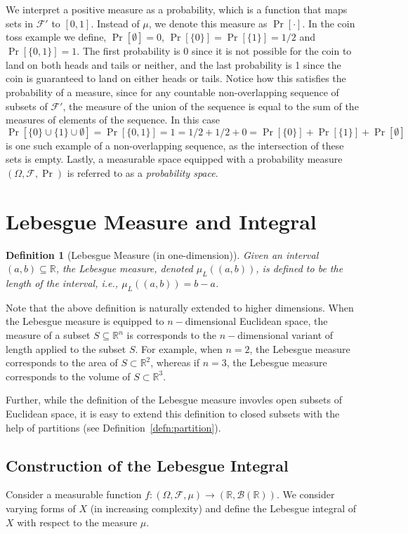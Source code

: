 \documentclass[10pt, oneside]{article}
\newcommand{\R}{\mathbb{R}}
\newtheorem{defn}{Definition}
\begin{document}
We interpret a positive measure as a probability, which is a function that maps sets in $\mathcal{F}'$ to $[0,1]$.
Instead of $\mu$, we denote this measure as $\Pr[\cdot]$.
In the coin toss example we define, $\Pr[\emptyset]=0$, $\Pr[\{0\}]=\Pr[\{1\}]=1/2$ and $\Pr[\{0,1\}]=1$.
The first probability is 0 since it is not possible for the coin to land on both heads and tails or neither, and the last probability is 1 since the coin is guaranteed to land on either heads or tails.
Notice how this satisfies the probability of a measure, since for any countable non-overlapping sequence of subsets of $\mathcal{F}'$, the measure of the union of the sequence is equal to the sum of the measures of elements of the sequence. In this case
$$\Pr[\{0\}\cup\{1\}\cup\emptyset]=\Pr[\{0,1\}]=1=1/2+1/2+0=\Pr[\{0\}]+\Pr[\{1\}]+\Pr[\emptyset]$$
is one such example of a non-overlapping sequence, as the intersection of these sets is empty.
Lastly, a measurable space equipped with a probability measure $(\Omega,\mathcal{F},\Pr)$ is referred to as a \emph{probability space}.

\section{Lebesgue Measure and Integral}
\begin{defn}[Lebesgue Measure (in one-dimension)]
    Given an interval $(a,b) \subseteq \R$, the Lebesgue measure, denoted $\mu_L((a,b))$, 
    is defined to be the length of the interval, i.e., $\mu_L((a,b)) = b-a$. 
\end{defn}
Note that the above definition is naturally extended to higher dimensions. When the 
Lebesgue measure is equipped to $n-$dimensional Euclidean space, the measure of a subset 
$S \subseteq \R^{n}$ is corresponds to the $n-$dimensional variant of length applied to 
the subset $S$. For example, when $n=2$, the Lebesgue measure corresponds to the area of 
$S \subset \R^2$, whereas if $n=3$, the Lebesgue measure corresponds to the volume of $S
\subset \R^3$. 

Further, while the definition of the Lebesgue measure invovles open subsets of Euclidean 
space, it is easy to extend this definition to closed subsets with the help of partitions
(see Definition~\ref{defn:partition}).  

\subsection{Construction of the Lebesgue Integral}
Consider a measurable function $f \colon (\Omega, \mathcal{F}, \mu) \to (\R,\mathcal{B}(\R))$. 
We consider varying forms of $X$ (in increasing complexity) and define the Lebesgue integral 
of $X$ with respect to the measure $\mu$. 
\end{document}
